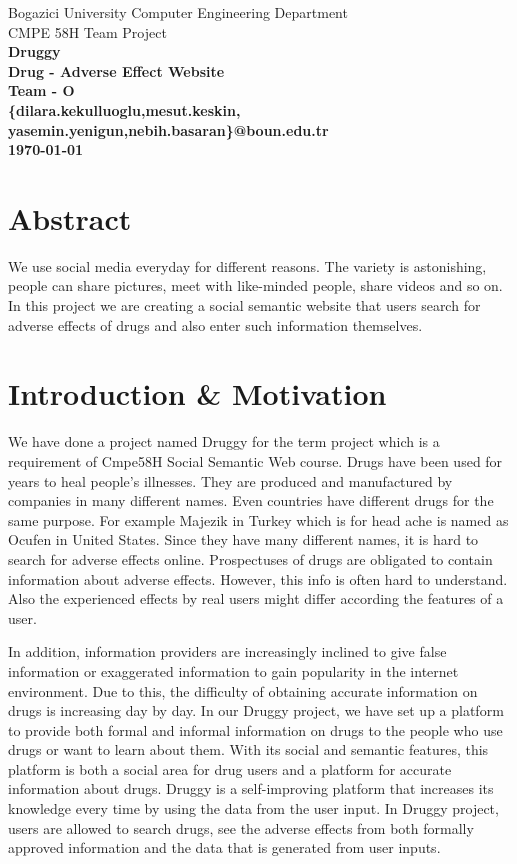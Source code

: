 \documentclass[21pt,a4paper,notitlepage]{report}
\begin{document}
  \begin{titlepage}
\centering
Bogazici University Computer Engineering Department\\
CMPE 58H Team Project\\
\vspace*{11\baselineskip}
\LARGE
\bfseries
Druggy \\ Drug - Adverse Effect Website\\[2\baselineskip]
\normalfont
\footnotesize
\small
\vfill
Team - O \\ \{dilara.kekulluoglu,mesut.keskin,\\ yasemin.yenigun,nebih.basaran\}@boun.edu.tr \\[3\baselineskip]


\textbf{\today} \\[2\baselineskip]
\end{titlepage}

\section*{Abstract}
We use social media everyday for different
reasons. The variety is astonishing, people
can share pictures, meet with like-minded people,
share videos and so on. In this project we
are creating a social semantic website
that users search for adverse effects of
drugs and also enter such information themselves.

\section{Introduction \& Motivation}
\label{sec:intro}
We have done a project named Druggy for the term project which is a
requirement of Cmpe58H Social Semantic Web course.
Drugs have been used for years to heal people's illnesses.
They are produced and manufactured by companies in many different
names. Even countries have different drugs for the same purpose.
For example Majezik in Turkey which is for head ache is
named as Ocufen in United States. Since they have
many different names, it is hard to search for adverse
effects online. Prospectuses of drugs are obligated to contain information
about adverse effects. However, this info is often hard
to understand. Also the experienced effects by real users
might differ according the features of a user.

In addition, information providers are increasingly
inclined to give false information or exaggerated
information to gain popularity in the internet environment.
Due to this, the difficulty of obtaining accurate information
on drugs is increasing day by day. In our Druggy project, we have
set up a platform to provide both formal and informal information
on drugs to the people who use drugs or want to learn about them.
With its social and semantic features, this platform is both a social 
area for drug users and a platform for accurate information about drugs.
Druggy is a self-improving platform that increases its knowledge
every time by using the data from the user input.
In Druggy project, users are allowed to search drugs,
see the adverse effects from both formally approved information
and the data that is generated from user inputs.
\end{document}
